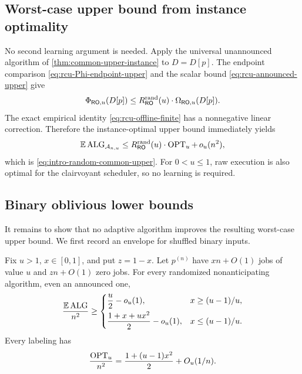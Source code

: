 \subsection{Worst-case upper bound from instance optimality}

No second learning argument is needed.  Apply the universal unannounced
algorithm of \cref{thm:common-upper-instance} to $D=D[p]$.  The endpoint
comparison \cref{eq:rcu-Phi-endpoint-upper} and the scalar bound
\cref{eq:rcu-announced-upper} give
\[
 \Phi_{\mathsf{RO},u}(D[p])
 \le R_{\mathsf{RO}}^{\mathrm{rand}}(u)\cdot\Omega_{\mathsf{RO},u}(D[p]).
\]
The exact empirical identity \cref{eq:rcu-offline-finite} has a nonnegative
linear correction.  Therefore the instance-optimal upper bound immediately
yields
\begin{equation}
 \mathbb{E}\operatorname{ALG}_{\mathcal A_{n,u}}
 \le R_{\mathsf{RO}}^{\mathrm{rand}}(u)\cdot\operatorname{OPT}_u+\,o_u(n^2),
 \label{eq:rcu-final-upper}
\end{equation}
which is \eqref{eq:intro-random-common-upper}.  For $0<u\le1$, raw execution
is also optimal for the clairvoyant scheduler, so no learning is required.

\subsection{Binary oblivious lower bounds}

It remains to show that no adaptive algorithm improves the resulting
worst-case upper bound.  We first record an
envelope for shuffled binary inputs.

\begin{lemma}
\label{lem:rcu-binary-lower}
Fix $u>1$, $x\in[0,1]$, and put $z=1-x$.  Let $p^{(n)}$ have $xn+O(1)$
jobs of value $u$ and $zn+O(1)$ zero jobs.  For every
randomized nonanticipating algorithm, even an announced one,
\begin{equation}
 \frac{\mathbb{E}\operatorname{ALG}}{n^2}\ge
 \begin{cases}
  \displaystyle\frac u2-o_u(1),&x\ge (u-1)/u,\\[6pt]
  \displaystyle\frac{1+x+ux^2}{2}-o_u(1),&x\le(u-1)/u.
 \end{cases}
 \label{eq:rcu-binary-fluid-lower}
\end{equation}
Every labeling has
\begin{equation}
 \frac{\operatorname{OPT}_u}{n^2}
 =\frac{1+(u-1)x^2}{2}+O_u(1/n).
 \label{eq:rcu-binary-offline}
\end{equation}
\end{lemma}

